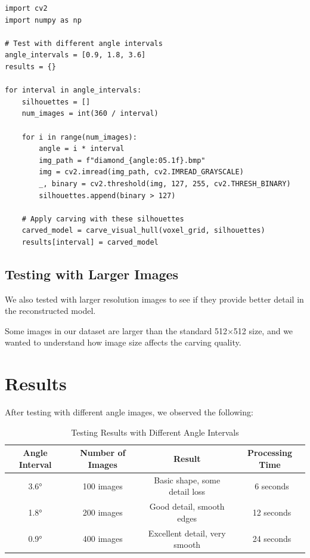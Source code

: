 \documentclass[a4paper,12pt]{article}
\begin{document}
\begin{verbatim}
import cv2
import numpy as np

# Test with different angle intervals
angle_intervals = [0.9, 1.8, 3.6]
results = {}

for interval in angle_intervals:
    silhouettes = []
    num_images = int(360 / interval)
    
    for i in range(num_images):
        angle = i * interval
        img_path = f"diamond_{angle:05.1f}.bmp"
        img = cv2.imread(img_path, cv2.IMREAD_GRAYSCALE)
        _, binary = cv2.threshold(img, 127, 255, cv2.THRESH_BINARY)
        silhouettes.append(binary > 127)
    
    # Apply carving with these silhouettes
    carved_model = carve_visual_hull(voxel_grid, silhouettes)
    results[interval] = carved_model
\end{verbatim}

\subsection{Testing with Larger Images}

We also tested with larger resolution images to see if they provide better detail in the reconstructed model.  

Some images in our dataset are larger than the standard 512×512 size, and we wanted to understand how image size affects the carving quality.

\section{Results}

After testing with different angle images, we observed the following:

\begin{table}[h!]
\centering
\caption{Testing Results with Different Angle Intervals}
\begin{tabular}{|c|c|c|c|}
\hline
\textbf{Angle Interval} & \textbf{Number of Images} & \textbf{Result} & \textbf{Processing Time} \\
\hline
3.6° & 100 images & Basic shape, some detail loss & ~6 seconds \\
1.8° & 200 images & Good detail, smooth edges & ~12 seconds \\
0.9° & 400 images & Excellent detail, very smooth & ~24 seconds \\
\hline
\end{tabular}
\label{tab:testing}
\end{table}
\end{document}
